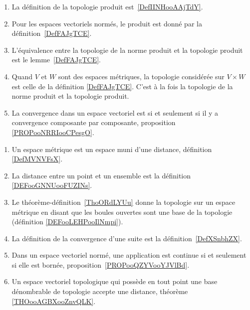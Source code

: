        \label{THEMEooYRIWooDXZnhX}
    \begin{enumerate}
        \item
            La définition de la topologie produit est~\ref{DefIINHooAAjTdY}.
        \item
            Pour les espaces vectoriels normés, le produit est donné par la définition~\ref{DefFAJgTCE}.
        \item
            L'équivalence entre la topologie de la norme produit et la topologie produit est le lemme~\ref{DefFAJgTCE}.
        \item
            Quand \( V\) et \( W\) sont des espaces métriques, la topologie considérée sur \( V\times W\) est celle de la définition \ref{DefFAJgTCE}. C'est à la fois la topologie de la norme produit et la topologie produit.
        \item
            La convergence dans un espace vectoriel est si et seulement si il y a convergence composante par composante, proposition \ref{PROPooNRRIooCPesgO}.
        \end{enumerate}

\begin{enumerate}
    \item
        Un espace métrique est un espace muni d'une distance, définition \ref{DefMVNVFsX}.
    \item
        La distance entre un point et un ensemble est la définition \ref{DEFooGNNUooFUZINs}.
    \item
        Le théorème-définition~\ref{ThoORdLYUu} donne la topologie sur un espace métrique en disant que les boules ouvertes sont une base de la topologie (définition \ref{DEFooLEHPooIlNmpi}).
    \item
        La définition de la convergence d'une suite est la définition~\ref{DefXSnbhZX}.
    \item
        Dans un espace vectoriel normé, une application est continue si et seulement si elle est bornée, proposition~\ref{PROPooQZYVooYJVlBd}.
    \item
        Un espace vectoriel topologique qui possède en tout point une base dénombrable de topologie accepte une distance, théorème \ref{THOooAGBXooZnvQLK}.
\end{enumerate}


